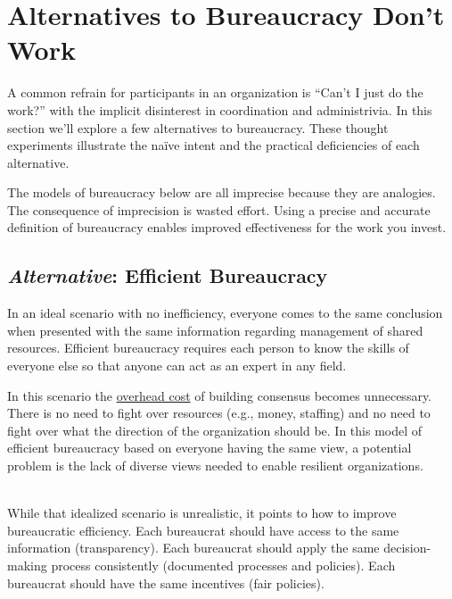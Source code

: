 \section{Alternatives to Bureaucracy Don't Work\label{sec:alternatives-to-bureaucracy}}
A common refrain for participants in an organization is ``Can't I just do the work?'' with the implicit disinterest in coordination and administrivia. In this section we'll explore a few alternatives to bureaucracy. These thought experiments illustrate the na\"ive intent and the practical deficiencies of each alternative.

The models of bureaucracy below are all imprecise because they are analogies. The consequence of imprecision is wasted effort. Using a precise and accurate definition of bureaucracy enables improved effectiveness for the work you invest.



\subsection*{\textit{Alternative}: Efficient Bureaucracy}

In an ideal scenario with no inefficiency, everyone comes to the same conclusion when presented with the same information regarding management of shared resources. Efficient bureaucracy requires each person to know the skills of everyone else so that anyone can act as an expert in any field. 

In this scenario the 
\href{https://en.wikipedia.org/wiki/Overhead_(business)}{overhead cost} 
of building consensus becomes unnecessary. There is no need to fight over resources (e.g., money, staffing) and no need to fight over what the direction of the organization should be. In this model of efficient bureaucracy based on everyone having the same view, a potential problem is the lack of diverse views needed to enable resilient organizations.

\ \\

While that idealized scenario is unrealistic, it points to how to improve bureaucratic efficiency. Each bureaucrat should have access to the same information (transparency). 
Each bureaucrat should apply the same decision-making process consistently (documented processes and policies).
Each bureaucrat should have the same incentives (fair policies).

